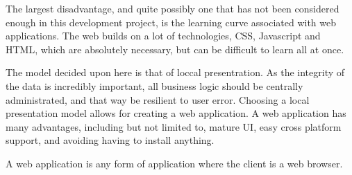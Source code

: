 The largest disadvantage, and quite possibly one that has not been considered enough in this development project, is the learning curve associated with web applications.
The web builds on a lot of technologies, CSS, Javascript and HTML, which are absolutely necessary, but can be difficult to learn all at once.

The model decided upon here is that of loccal presentration.
As the integrity of the data is incredibly important, all business logic should be centrally administrated, and that way be resilient to user error.
Choosing a local presentation model allows for creating a web application.
A web application has many advantages, including but not limited to, mature UI, easy cross platform support, and avoiding having to install anything.

A web application is any form of application where the client is a web browser.
